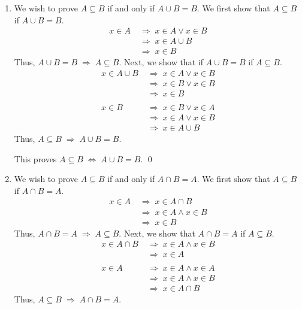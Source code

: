 \documentclass[10pt]{article}
\begin{document}
\begin{enumerate}
		
		\item
		We wish to prove $A \subseteq B$ if and only if $A \cup B = B$. We first show that $A \subseteq B$ if $A \cup B = B$.
		\begin{align*}
			x \in A
			\;&\Rightarrow\; x \in A \lor x \in B\\
			\;&\Rightarrow\; x \in A \cup B\\
			\;&\Rightarrow\; x \in B                                        \tag{$A \cup B = B$}
		\end{align*}
		Thus, $A \cup B = B \;\Rightarrow\; A \subseteq B$. Next, we show that if $A \cup B = B$ if $A \subseteq B$.
		\begin{align*}
			x \in A \cup B
			\;&\Rightarrow\; x \in A \lor x \in B\\
			\;&\Rightarrow\; x \in B \lor x \in B                           \tag{$A \subseteq B$}\\
			\;&\Rightarrow\; x \in B\\\\
			x \in B
			\;&\Rightarrow\; x \in B \lor x \in A\\
			\;&\Rightarrow\; x \in A \lor x \in B\\
			\;&\Rightarrow\; x \in A \cup B
		\end{align*}
		Thus, $A \subseteq B \;\Rightarrow\; A \cup B = B$.
		
		This proves $A \subseteq B \;\Leftrightarrow\; A \cup B = B$. \qed
		
		
		\item
		We wish to prove $A \subseteq B$ if and only if $A \cap B = A$. We first show that $A \subseteq B$ if $A \cap B = A$.
		\begin{align*}
			x \in A
			\;&\Rightarrow\; x \in A \cap B                                 \tag{$A \cap B = A$}\\
			\;&\Rightarrow\; x \in A \land x \in B\\
			\;&\Rightarrow\; x \in B
		\end{align*}
		Thus, $A \cap B = A \;\Rightarrow\; A \subseteq B$. Next, we show that $A \cap B = A$ if $A \subseteq B$.
		\begin{align*}
			x \in A \cap B
			\;&\Rightarrow\; x \in A \land x \in B\\
			\;&\Rightarrow\; x \in A\\\\
			x \in A
			\;&\Rightarrow\; x \in A \land x \in A\\
			\;&\Rightarrow\; x \in A \land x \in B                          \tag{$A \subseteq B$}\\
			\;&\Rightarrow\; x \in A \cap B
		\end{align*}
		Thus, $A \subseteq B \;\Rightarrow\; A \cap B = A$.
		

\end{enumerate}
\end{document}
